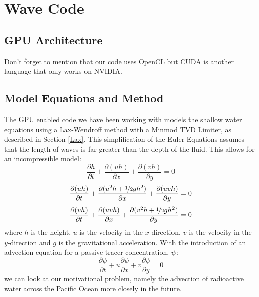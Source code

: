 \section{Wave Code}
\label{WaveCode}
\subsection{GPU Architecture}
Don't forget to mention that our code uses OpenCL but CUDA is another language that only works on NVIDIA.
\subsection{Model Equations and Method}
The GPU enabled code we have been working with models the shallow water equations using a Lax-Wendroff method with a Minmod TVD Limiter, as described in Section \ref{Lax}. This simplification of the Euler Equations assumes that the length of waves is far greater than the depth of the fluid. This allows for an incompressible model:
\[
\frac{\partial h}{\partial t} + \frac{\partial(uh)}{\partial x} + \frac{\partial(vh)}{\partial y} = 0
\] \[
\frac{\partial (uh)}{\partial t} + \frac{\partial(u^2h+\nicefrac{1}{2} g h^2)}{\partial x} + \frac{\partial(uvh)}{\partial y} = 0
\] \[
\frac{\partial (vh)}{\partial t} + \frac{\partial(uvh)}{\partial x}+ \frac{\partial(v^2h+\nicefrac{1}{2} g h^2)}{\partial y}  = 0
\]
where $h$ is the height, $u$ is the velocity in the $x$-direction, $v$ is the velocity in the $y$-direction and $g$ is the gravitational acceleration. With the introduction of an advection equation for a passive tracer concentration, $\psi$:
\[
\frac{\partial \psi}{\partial t} + u\frac{\partial \psi}{\partial x} + v\frac{\partial \psi}{\partial y} = 0
\]
we can look at our motivational problem, namely the advection of radioactive water across the Pacific Ocean more closely in the future.